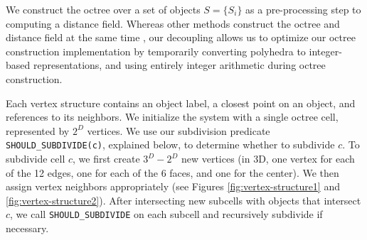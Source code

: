\documentclass{egpubl}
\begin{document}
We construct the octree over a set of objects $S=\{S_i\}$ as a pre-processing step to computing a distance field.  Whereas other methods construct the octree and distance field at the same time \cite{frisken2000adaptively,strain1999fast}, our decoupling allows us to optimize our octree construction implementation by temporarily converting polyhedra to integer-based representations, and using entirely integer arithmetic during octree construction.

 Each vertex structure contains an object label, a closest point on an object, and references to its neighbors.
We initialize the system with a single octree cell, represented by $2^D$ vertices.  We use our subdivision predicate \texttt{SHOULD\_SUBDIVIDE(c)}, explained below, to determine whether to subdivide $c$.  To subdivide cell $c$, we first create $3^D-2^D$ new vertices (in 3D, one vertex for each of the 12 edges, one for each of the 6 faces, and one for the center).  We then assign vertex neighbors appropriately (see Figures \ref{fig:vertex-structure1} and \ref{fig:vertex-structure2}).  After intersecting new subcells with objects that intersect $c$, we call \texttt{SHOULD\_SUBDIVIDE} on each subcell and recursively subdivide if necessary.
\end{document}
